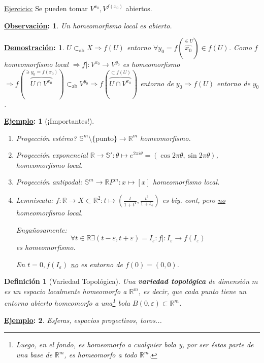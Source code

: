 \documentclass[10pt,a4paper,openright]{book}
\theoremstyle{break}
\newtheorem*{defi}{Definición}
\newtheorem*{demo}{\underline{Demostración}:}
\newtheorem*{obs}{\underline{Observación}:}
\newtheorem*{ej}{\underline{Ejemplo}:}
\begin{document}
\underline{Ejercicio:} Se pueden tomar $V^{x_0}, V^{f\left( x_0 \right)}$ abiertos.

\begin{obs}
Un homeomorfismo local es abierto.
\end{obs}
\begin{demo}
    $U \subset_{\text{ab}} X \Rightarrow f\left( U \right)$ entorno $\forall y_0 = f\left(\overbrace{x_0}^{\in U}\right) \in f\left( U \right)$.
    Como $f$ homeomorfismo local $\Rightarrow f| : V^{x_0} \rightarrow V^{y_0}$ es homeomorfismo $\Rightarrow f\left( \overbrace{U \cap V^{x_0}}^{\ni y_0 = f\left( x_0 \right)} \right) \subset_{\text{ab}} V^{y_0} \Rightarrow f\left( \overbrace{U \cap V^{x_0}}^{\subset f\left( U \right)} \right)$ entorno de $y_0 \Rightarrow f\left( U \right)$ entorno de $y_0$.
\end{demo}

\begin{ej}[¡Importantes!]
\begin{enumerate}
    \item Proyección estéreo? $\mathbb{S}^{m} \setminus \{\text{punto}\} \rightarrow \mathbb{R}^m$ homeomorfismo.
    \item Proyección exponencial $\mathbb{R} \rightarrow \mathbb{S}': \theta \mapsto e^{2\pi i\theta} = \left( \cos 2\pi \theta, \sin 2\pi \theta \right)$, homeomorfismo local.
    \item Proyección antipodal: $\mathbb{S}^m \rightarrow \mathbb{R}P^{m}: x \mapsto \left[ x \right]$ homeomorfismo local.
    \item Lemniscata: $f: \mathbb{R} \rightarrow X \subset \mathbb{R}^2: t \mapsto \left( \frac{t}{1 + t^4}, \frac{t^3}{1 + t_4} \right)$ es biy. cont, pero \underline{no} homeomorfismo local.

    Engañosamente: 
    \[
        \forall t \in \mathbb{R} \exists \left( t - \varepsilon, t + \varepsilon \right) = I_{\varepsilon}: f| : I_{\varepsilon} \rightarrow f\left( I_{\varepsilon} \right) 
    \]
    es homeomorfismo.

    En $t = 0, f\left( I_{\varepsilon} \right)$ \underline{no} es entorno de $f\left( 0 \right) = \left( 0, 0 \right)$.
\end{enumerate} 
\end{ej}

\begin{defi}[Variedad Topológica]
Una \textbf{variedad topológica} de dimensión $m$ es un espacio localmente homeomorfo a $\mathbb{R}^m$, es decir, que cada punto tiene un entorno abierto homeomorfo a una\footnote{Luego, en el fondo, es homeomorfo a cualquier bola y, por ser éstas parte de una base de $\mathbb{R}^m$, es homeomorfo a todo $\mathbb{R}^m$.} bola $B\left( 0, \varepsilon \right) \subset \mathbb{R}^m$.
\end{defi}
\begin{ej}
Esferas, espacios proyectivos, toros...
\end{ej}
\end{document}
